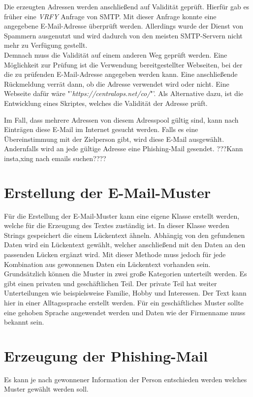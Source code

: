 Die erzeugten Adressen werden anschließend auf Validität geprüft. Hierfür gab es früher eine \textit{VRFY} Anfrage von SMTP. Mit dieser Anfrage konnte eine angegebene E-Mail-Adresse überprüft werden. Allerdings wurde der Dienst von Spammern ausgenutzt und wird dadurch von den meisten SMTP-Servern nicht mehr zu Verfügung gestellt.\cite{balduzzi2010abusing}\\
Demnach muss die Validität auf einem anderen Weg geprüft werden. Eine Möglichkeit zur Prüfung ist die Verwendung bereitgestellter Webseiten, bei der die zu prüfenden E-Mail-Adresse angegeben werden kann. Eine anschließende Rückmeldung verrät dann, ob die Adresse verwendet wird oder nicht. Eine Webseite dafür wäre "'\textit{https://centralops.net/co/}"'. Als Alternative dazu, ist die Entwicklung eines Skriptes, welches die Validität der Adresse prüft.

Im Fall, dass mehrere Adressen von diesem Adresspool gültig sind, kann nach Einträgen diese E-Mail im Internet gesucht werden. Falls es eine Übereinstimmung mit der Zielperson gibt, wird diese E-Mail ausgewählt. Andernfalls wird an jede gültige Adresse eine Phishing-Mail gesendet. 
???Kann insta,xing nach emails suchen????
\section{Erstellung der E-Mail-Muster}
Für die Erstellung der E-Mail-Muster kann eine eigene Klasse erstellt werden, welche für die Erzeugung des Textes zuständig ist. In dieser Klasse werden Strings gespeichert die einem Lückentext ähneln. Abhängig von den gefundenen Daten wird ein Lückentext gewählt, welcher anschließend mit den Daten an den passenden Lücken ergänzt wird. Mit dieser Methode muss jedoch für jede Kombination aus gewonnenen Daten ein Lückentext vorhanden sein.\\
Grundsätzlich können die Muster in zwei große Kategorien unterteilt werden. Es gibt einen privaten und geschäftlichen Teil. Der private Teil hat weiter Unterteilungen wie beispielsweise Familie, Hobby und Interessen. Der Text kann hier in einer Alltagssprache erstellt werden. Für ein geschäftliches Muster sollte eine gehoben Sprache angewendet werden und Daten wie der Firmenname muss bekannt sein. 
\section{Erzeugung der Phishing-Mail}
Es kann je nach gewonnener Information der Person entschieden werden welches Muster gewählt werden soll.